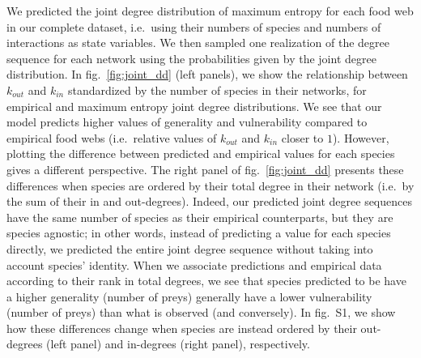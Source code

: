 \documentclass[11pt]{article}
\begin{document}
We predicted the joint degree distribution of maximum entropy for each
food web in our complete dataset, i.e.~using their numbers of species
and numbers of interactions as state variables. We then sampled one
realization of the degree sequence for each network using the
probabilities given by the joint degree distribution. In
fig.~\ref{fig:joint_dd} (left panels), we show the relationship between
\(k_{out}\) and \(k_{in}\) standardized by the number of species in
their networks, for empirical and maximum entropy joint degree
distributions. We see that our model predicts higher values of
generality and vulnerability compared to empirical food webs
(i.e.~relative values of \(k_{out}\) and \(k_{in}\) closer to \(1\)).
However, plotting the difference between predicted and empirical values
for each species gives a different perspective. The right panel of
fig.~\ref{fig:joint_dd} presents these differences when species are
ordered by their total degree in their network (i.e.~by the sum of their
in and out-degrees). Indeed, our predicted joint degree sequences have
the same number of species as their empirical counterparts, but they are
species agnostic; in other words, instead of predicting a value for each
species directly, we predicted the entire joint degree sequence without
taking into account species' identity. When we associate predictions and
empirical data according to their rank in total degrees, we see that
species predicted to be have a higher generality (number of preys)
generally have a lower vulnerability (number of preys) than what is
observed (and conversely). In fig.~S1, we show how these differences
change when species are instead ordered by their out-degrees (left
panel) and in-degrees (right panel), respectively.
\end{document}
